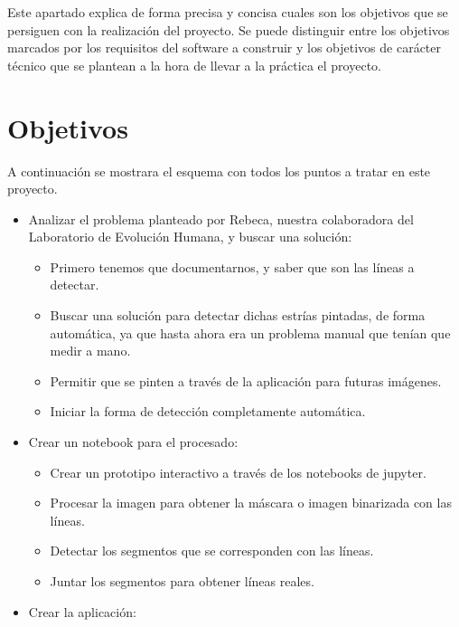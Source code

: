 
Este apartado explica de forma precisa y concisa cuales son los objetivos que se persiguen con la realización del proyecto. Se puede distinguir entre los objetivos marcados por los requisitos del software a construir y los objetivos de carácter técnico que se plantean a la hora de llevar a la práctica el proyecto.

\section{Objetivos}
A continuación se mostrara el esquema con todos los puntos a tratar en este proyecto.
\begin{itemize}
\item Analizar el problema planteado por Rebeca, nuestra colaboradora del Laboratorio de Evolución Humana, y buscar una solución:
	\begin{itemize}
		\item Primero tenemos que documentarnos, y saber que son las líneas a detectar.
		\item Buscar una solución para detectar dichas estrías pintadas, de forma automática, ya que hasta ahora era un problema manual que tenían que medir a mano.
		\item Permitir que se pinten a través de la aplicación para futuras imágenes.
		\item Iniciar la forma de detección completamente automática.
	\end{itemize}
\item Crear un notebook para el procesado:
	\begin{itemize}
		\item Crear un prototipo interactivo a través de los notebooks de jupyter.
		\item Procesar la imagen para obtener la máscara o imagen binarizada con las líneas.
		\item Detectar los segmentos que se corresponden con las líneas.
		\item Juntar los segmentos para obtener líneas reales.
	\end{itemize}
\item Crear la aplicación:
\end{itemize}

